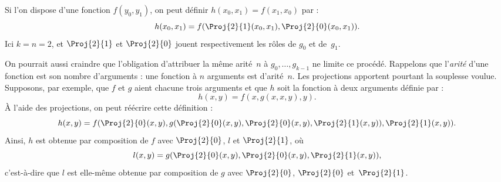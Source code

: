 \documentclass[../../../include/open-logic-section]{subfiles}
\begin{document}
Si l'on dispose d'une fonction $f(y_0,y_1)$, on peut définir
$h(x_0,x_1)=f(x_1,x_0)$ par :
\[
h(x_0, x_1) = f(\Proj{2}{1}(x_0, x_1),\Proj{2}{0}(x_0, x_1)).
\]
Ici $k=n=2$, et $\Proj{2}{1}$ et $\Proj{2}{0}$ jouent
respectivement les rôles de $g_0$ et de~$g_1$.

On pourrait aussi craindre que l'obligation d'attribuer la même
arité~$n$ à $g_0,\dots,g_{k-1}$ ne limite ce procédé. Rappelons
que l'\emph{arité} d'une fonction est son nombre d'arguments :
une fonction à $n$ arguments est d'arité~$n$. Les projections
apportent pourtant la souplesse voulue. Supposons, par exemple,
que $f$ et $g$ aient chacune trois arguments et que $h$ soit la
fonction à deux arguments définie par :
\[
h(x,y) = f(x,g(x,x,y),y).
\]
À l'aide des projections, on peut réécrire cette définition :
\[
h(x,y) = f(\Proj{2}{0}(x,y), g(\Proj{2}{0}(x,y), \Proj{2}{0}(x,y),
\Proj{2}{1}(x,y)), \Proj{2}{1}(x,y)).
\]
Ainsi, $h$ est obtenue par composition de $f$ avec
$\Proj{2}{0}$, $l$ et $\Proj{2}{1}$, où
\[
l(x,y) = g(\Proj{2}{0}(x,y),\Proj{2}{0}(x,y),\Proj{2}{1}(x,y)),
\]
c'est-à-dire que $l$ est elle-même obtenue par composition de $g$
avec $\Proj{2}{0}$, $\Proj{2}{0}$ et~$\Proj{2}{1}$.
\end{document}
